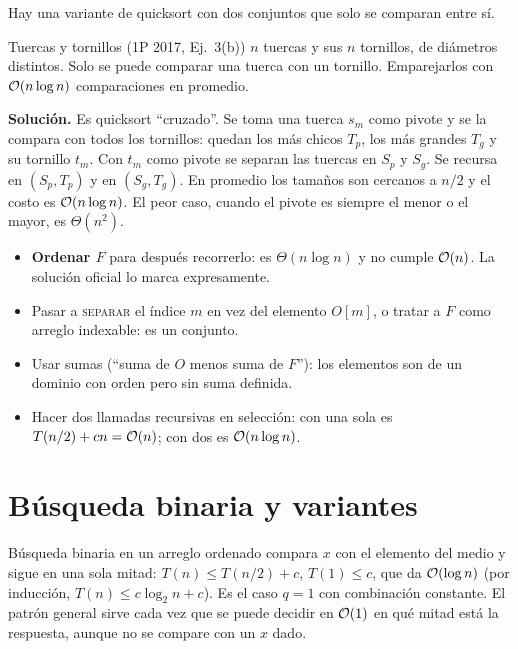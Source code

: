 Hay una variante de quicksort con dos conjuntos que solo se comparan entre sí.

\begin{problema}{Tuercas y tornillos (1P 2017, Ej.~3(b))}
$n$ tuercas y sus $n$ tornillos, de diámetros distintos. Solo se puede comparar una tuerca con un tornillo. Emparejarlos con $\mathcal{O}(n\log n)$ comparaciones en promedio.

\textbf{Solución.} Es quicksort ``cruzado''. Se toma una tuerca $s_m$ como pivote y se la compara con todos los tornillos: quedan los más chicos $T_p$, los más grandes $T_g$ y su tornillo $t_m$. Con $t_m$ como pivote se separan las tuercas en $S_p$ y $S_g$. Se recursa en $(S_p,T_p)$ y en $(S_g,T_g)$. En promedio los tamaños son cercanos a $n/2$ y el costo es $\mathcal{O}(n\log n)$. El peor caso, cuando el pivote es siempre el menor o el mayor, es $\Theta(n^2)$.
\end{problema}

\begin{trampa}
\begin{itemize}
  \item \textbf{Ordenar $F$} para después recorrerlo: es $\Theta(n\log n)$ y no cumple $\mathcal{O}(n)$. La solución oficial lo marca expresamente.
  \item Pasar a \textsc{separar} el índice $m$ en vez del elemento $O[m]$, o tratar a $F$ como arreglo indexable: es un conjunto.
  \item Usar sumas (``suma de $O$ menos suma de $F$''): los elementos son de un dominio con orden pero sin suma definida.
  \item Hacer dos llamadas recursivas en selección: con una sola es $T(n/2)+cn=\mathcal{O}(n)$; con dos es $\mathcal{O}(n\log n)$.
\end{itemize}
\end{trampa}

\section{Búsqueda binaria y variantes}

Búsqueda binaria en un arreglo ordenado compara $x$ con el elemento del medio y sigue en una sola mitad: $T(n)\le T(n/2)+c$, $T(1)\le c$, que da $\mathcal{O}(\log n)$ (por inducción, $T(n)\le c\log_2 n+c$). Es el caso $q=1$ con combinación constante. El patrón general sirve cada vez que se puede decidir en $\mathcal{O}(1)$ en qué mitad está la respuesta, aunque no se compare con un $x$ dado.

